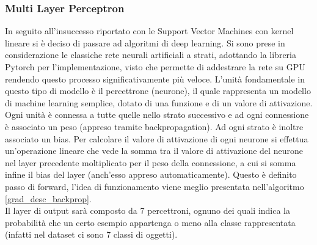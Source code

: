\subsubsection{Multi Layer Perceptron}
In seguito all'insuccesso riportato con le Support Vector Machines con kernel lineare si è deciso di passare ad algoritmi di deep learning. Si sono prese in considerazione le classiche rete neurali artificiali a strati, adottando la libreria Pytorch per l'implementazione, visto che permette di addestrare la rete su GPU rendendo questo processo significativamente più veloce.
L'unità fondamentale in questo tipo di modello è il percettrone (neurone), il quale rappresenta un modello di machine learning semplice, dotato di una funzione e di un valore di attivazione. Ogni unità è connessa a tutte quelle nello strato successivo e ad ogni connessione è associato un peso (appreso tramite backpropagation). Ad ogni strato è inoltre associato un bias. Per calcolare il valore di attivazione di ogni neurone si effettua un'operazione lineare che vede la somma tra il valore di attivazione del neurone nel layer precedente moltiplicato per il peso della connessione, a cui si somma infine il bias del layer (anch'esso appreso automaticamente). Questo è definito passo di forward, l'idea di funzionamento viene meglio presentata nell'algoritmo \ref*{grad_desc_backprop}.\\
Il layer di output sarà composto da 7 percettroni, ognuno dei quali indica la probabilità che un certo esempio appartenga o meno alla classe rappresentata (infatti nel dataset ci sono 7 classi di oggetti).

